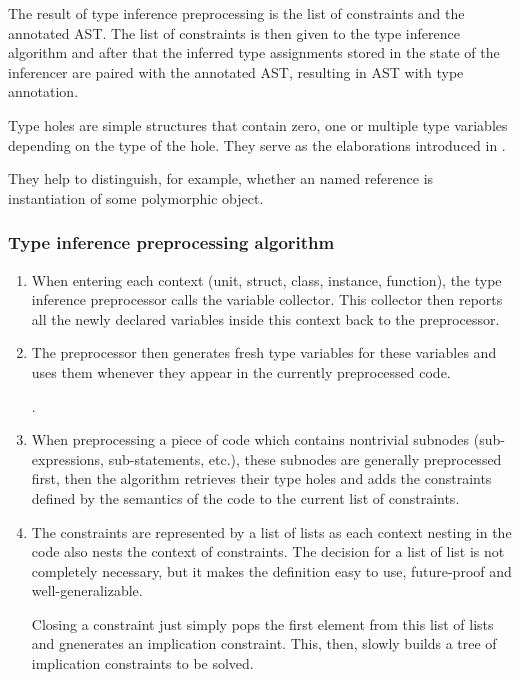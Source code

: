 The result of type inference preprocessing is the list of constraints and the annotated AST. The list of constraints is then given to the type inference algorithm and after that the inferred type assignments stored in the state of the inferencer are paired with the annotated AST, resulting in AST with type annotation.


\begin{defn}
    Type holes are simple structures that contain zero, one or multiple type variables depending on the type of the hole. They serve as the elaborations introduced in .

    They help to distinguish, for example, whether an named reference is instantiation of some polymorphic object.
\end{defn}

\subsubsection{Type inference preprocessing algorithm}
\begin{enumerate}
    \item When entering each context (unit, struct, class, instance, function), the type inference preprocessor calls the variable collector. This collector then reports all the newly declared variables inside this context back to the preprocessor.

    \item The preprocessor then generates fresh type variables for these variables and uses them whenever they appear in the currently preprocessed code.

    .

    \item When preprocessing a piece of code which contains nontrivial subnodes (sub-expressions, sub-statements, etc.), these subnodes are generally preprocessed first, then the algorithm retrieves their type holes and adds the constraints defined by the semantics of the code to the current list of constraints.

    \item The constraints are represented by a list of lists as each context nesting in the code also nests the context of constraints. The decision for a list of list is not completely necessary, but it makes the definition easy to use, future-proof and well-generalizable.

    Closing a constraint just simply pops the first element from this list of lists and gnenerates an implication constraint. This, then, slowly builds a tree of implication constraints to be solved.
\end{enumerate}

